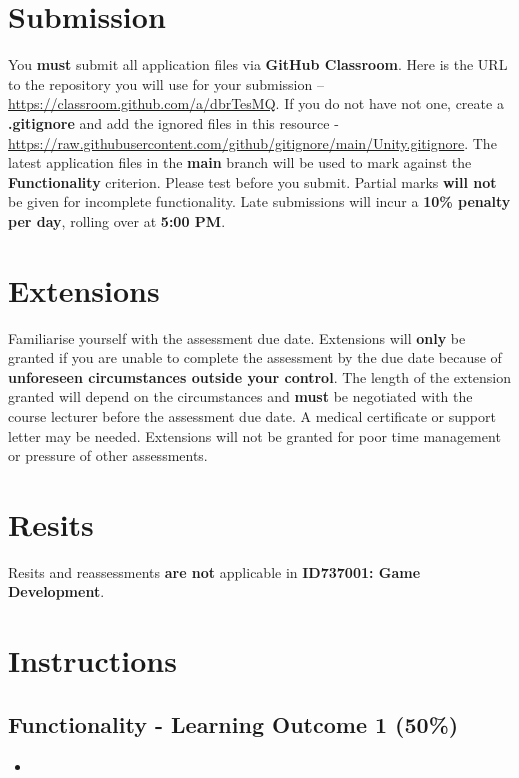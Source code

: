 \documentclass{article}
\begin{document}
\section*{Submission}
You \textbf{must} submit all application files via \textbf{GitHub Classroom}. Here is the URL to the repository you will use for your submission – \href{https://classroom.github.com/a/dbrTesMQ}{https://classroom.github.com/a/dbrTesMQ}. If you do not have not one, create a \textbf{.gitignore} and add the ignored files in this resource - \href{https://raw.githubusercontent.com/github/gitignore/main/Unity.gitignore}{https://raw.githubusercontent.com/github/gitignore/main/Unity.gitignore}. The latest application files in the \textbf{main} branch will be used to mark against the \textbf{Functionality} criterion. Please test before you submit. Partial marks \textbf{will not} be given for incomplete functionality. Late submissions will incur a \textbf{10\% penalty per day}, rolling over at \textbf{5:00 PM}.

\section*{Extensions}
Familiarise yourself with the assessment due date. Extensions will \textbf{only} be granted if you are unable to complete the assessment by the due date because of \textbf{unforeseen circumstances outside your control}. The length of the extension granted will depend on the circumstances and \textbf{must} be negotiated with the course lecturer before the assessment due date. A medical certificate or support letter may be needed. Extensions will not be granted for poor time management or pressure of other assessments.

\section*{Resits}
Resits and reassessments \textbf{are not} applicable in \textbf{ID737001: Game Development}.

\section*{Instructions}
\subsection*{Functionality - Learning Outcome 1 (50\%)}
\begin{itemize}
	\item 
\end{itemize}
\end{document}
